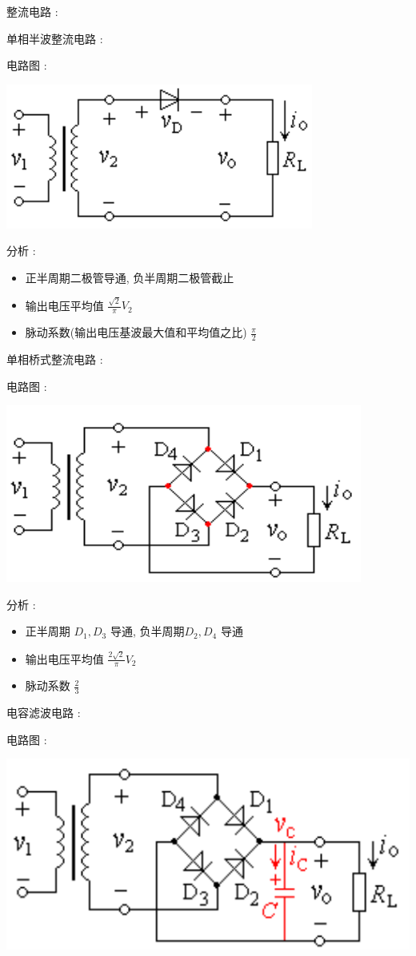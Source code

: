 \documentclass[UTF8, 12pt]{ctexart}
\begin{document}
	\noindent
	整流电路 :

	单相半波整流电路 :

	电路图 :

	\includegraphics[scale = 0.4]{08/单相半波整流电路电路图.png}

	分析 :
	\begin{itemize}[leftmargin = 4em]
		\item 正半周期二极管导通, 负半周期二极管截止
		\item 输出电压平均值 $ \frac{\sqrt{2}}{\pi}V_{2} $
		\item 脉动系数(输出电压基波最大值和平均值之比) $ \frac{\pi}{2} $
	\end{itemize}

	单相桥式整流电路 :

	电路图 :

	\includegraphics[scale = 0.4]{08/单相桥式整流电路电路图.png}

	分析 :
	\begin{itemize}[leftmargin = 4em]
		\item 正半周期 $ D_{1}, D_{3} $ 导通, 负半周期$ D_{2}, D_{4} $ 导通
		\item 输出电压平均值 $ \frac{2\sqrt{2}}{\pi}V_{2} $
		\item 脉动系数 $ \frac{2}{3} $
	\end{itemize}

	电容滤波电路 :

	电路图 :

	\includegraphics[scale = 0.4]{08/电容滤波电路电路图.png}
\end{document}

